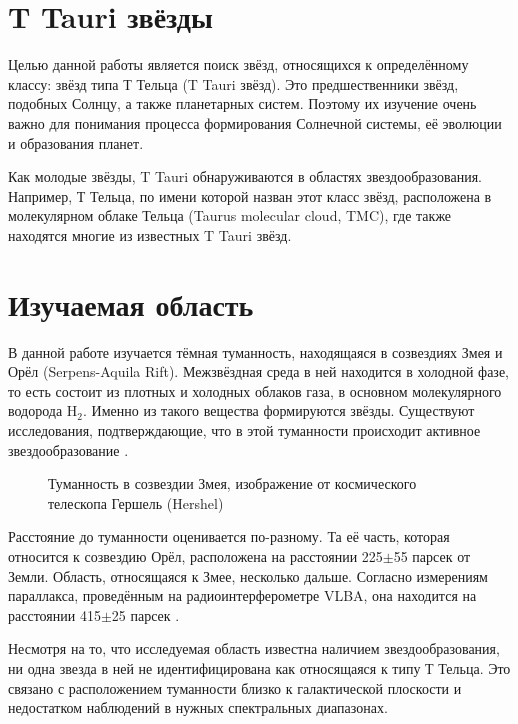 

\section{T Tauri звёзды}
Целью данной работы является поиск звёзд, относящихся к определённому классу: звёзд типа Т Тельца (T Tauri звёзд). 
Это предшественники звёзд, подобных Солнцу, а также планетарных систем. Поэтому их изучение очень важно для понимания процесса формирования Солнечной системы, её эволюции и образования планет. 

Как молодые звёзды, T Tauri обнаруживаются в областях звездообразования. Например, Т Тельца, по имени которой назван этот класс звёзд, расположена в молекулярном облаке Тельца (Taurus molecular cloud, TMC), где также находятся многие из известных T Tauri звёзд.

\section{Изучаемая область}

В данной работе изучается тёмная туманность, находящаяся в созвездиях Змея и Орёл (Serpens-Aquila Rift). Межзвёздная среда в ней находится в холодной фазе, то есть состоит из плотных и холодных облаков газа, в основном молекулярного водорода H$_{2}$. Именно из такого вещества формируются звёзды. Существуют исследования, подтверждающие, что в этой туманности происходит активное звездообразование \cite{park2012far}.

\begin{figure}[ht]
\hfill
\caption{Туманность в созвездии Змея, изображение от космического телескопа Гершель (Hershel)}
\label{fig:area}
\end{figure}


Расстояние до туманности оценивается по-разному. Та её часть, которая относится к созвездию Орёл, расположена на расстоянии 225$\pm$55 парсек от Земли. Область, относящаяся к Змее, несколько дальше. Согласно измерениям параллакса, проведённым на радиоинтерферометре VLBA, она находится на расстоянии 415$\pm$25 парсек \cite{park2012far}.

Несмотря на то, что исследуемая область известна наличием звездообразования, ни одна звезда в ней не идентифицирована как относящаяся к типу Т Тельца. Это связано с расположением туманности близко к галактической плоскости и недостатком наблюдений в нужных спектральных диапазонах.

